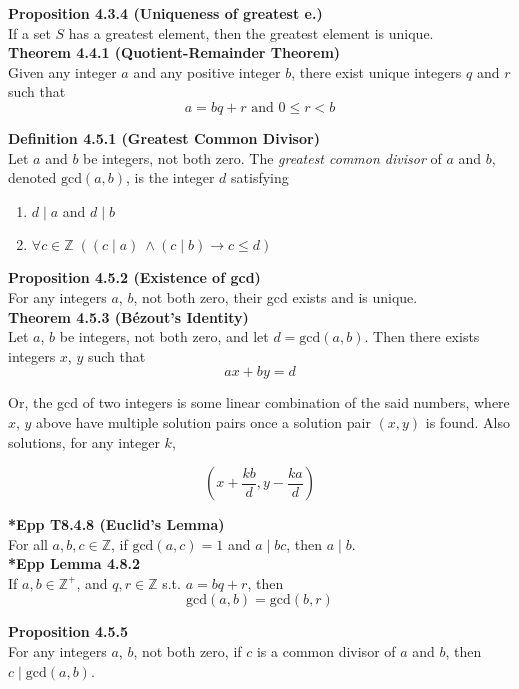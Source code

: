 \documentclass[a4paper]{article}
\newcommand{\subheading}[1]{{\scriptsize\textbf{#1}}}
\begin{document}
\begin{multicols*}{4}
\subheading{Proposition 4.3.4 (Uniqueness of greatest e.)}\\
If a set $S$ has a greatest element, then the greatest element is unique.\\

\subheading{Theorem 4.4.1 (Quotient-Remainder Theorem)}\\
Given any integer $a$ and any positive integer $b$, there exist unique integers
$q$ and $r$ such that $$ a = bq + r \text{ and } 0 \leq r < b$$

\subheading{Definition 4.5.1 (Greatest Common Divisor)}\\
Let $a$ and $b$ be integers, not both zero. The \textit{greatest common divisor}
of $a$ and $b$, denoted $\mathrm{gcd}(a, b)$, is the integer $d$ satisfying

\begin{enumerate} \itemsep -0.5em
  \item $d\;|\;a$ and $d\;|\;b$
  \item $\forall c \in \mathbb{Z}\;((c\;|\;a)\ \land (c\;|\;b) \rightarrow c \leq d)$
\end{enumerate}

\subheading{Proposition 4.5.2 (Existence of gcd)}\\
For any integers $a$, $b$, not both zero, their gcd exists and is unique.\\

\subheading{Theorem 4.5.3 (B\'ezout's Identity)}\\
Let $a$, $b$ be integers, not both zero, and let $d = \mathrm{gcd}(a, b)$. Then
there exists integers $x$, $y$ such that $$ax + by = d$$

Or, the gcd of two integers is some linear combination of the said numbers,
where $x$, $y$ above have multiple solution pairs once a solution pair $(x, y)$
is found. Also solutions, for any integer $k$,

$$ (x+\frac{kb}{d}, y-\frac{ka}{d}) $$

\subheading{*Epp T8.4.8 (Euclid's Lemma)}\\
For all $a, b, c \in \mathbb{Z}$, if $\mathrm{gcd}(a, c) = 1$ and $a\;|\;bc$,
then $a\;|\;b$.\\

\subheading{*Epp Lemma 4.8.2}\\
If $a, b \in \mathbb{Z}^+$, and $q, r \in \mathbb{Z}$ s.t. $a = bq + r$, then
$$\mathrm{gcd}(a, b)= \mathrm{gcd}(b, r)$$

\subheading{Proposition 4.5.5}\\
For any integers $a$, $b$, not both zero, if $c$ is a common divisor of $a$ and
$b$, then $c\;|\;\mathrm{gcd}(a,b)$.\\


\end{multicols*}
\end{document}
